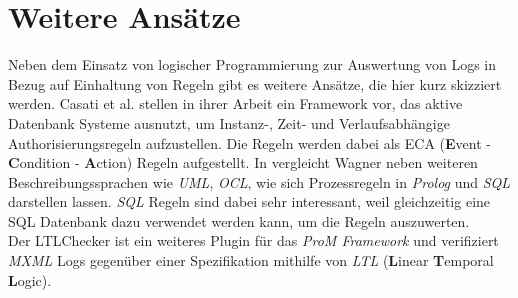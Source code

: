 \section{Weitere Ansätze}
Neben dem Einsatz von logischer Programmierung zur Auswertung von Logs in Bezug auf Einhaltung von Regeln gibt es weitere Ansätze, die hier kurz skizziert werden. Casati et al. stellen in ihrer Arbeit \cite{active_database} ein Framework vor, das aktive Datenbank Systeme ausnutzt, um Instanz-, Zeit- und Verlaufsabhängige Authorisierungsregeln aufzustellen. Die Regeln werden dabei als ECA (\textbf{E}vent - \textbf{C}ondition - \textbf{A}ction) Regeln aufgestellt. In \cite{rulelanguage} vergleicht Wagner neben weiteren Beschreibungssprachen wie \textit{UML}, \textit{OCL}, wie sich Prozessregeln in \textit{Prolog} und \textit{SQL} darstellen lassen. \textit{SQL} Regeln sind dabei sehr interessant, weil gleichzeitig eine SQL Datenbank dazu verwendet werden kann, um die Regeln auszuwerten.\\
Der LTLChecker ist ein weiteres Plugin für das \textit{ProM Framework} und verifiziert \textit{MXML} Logs  gegenüber einer Spezifikation mithilfe von \textit{LTL} (\textbf{L}inear \textbf{T}emporal \textbf{L}ogic).
\cite{LTLChecker}  

